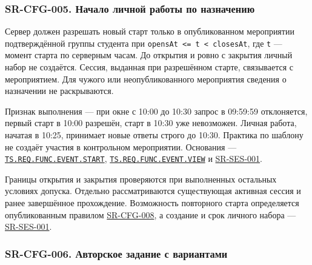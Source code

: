 \documentclass[12pt,a4paper]{article}
\begin{document}
\subsubsection{SR-CFG-005. Начало личной работы по назначению}\label{sr-cfg-005-ux43dux430ux447ux430ux43bux43e-ux43bux438ux447ux43dux43eux439-ux440ux430ux431ux43eux442ux44b-ux43fux43e-ux43dux430ux437ux43dux430ux447ux435ux43dux438ux44e}

\hypertarget{sr-cfg-005-начало-личной-работы-по-назначению}{}

\hypertarget{sr-cfg-005}{}

Сервер должен разрешать новый старт только в опубликованном мероприятии подтверждённой группы студента при \texttt{opensAt\ \textless{}=\ t\ \textless{}\ closesAt}, где \texttt{t} --- момент старта по серверным часам. До открытия и ровно с закрытия личный набор не создаётся. Сессия, выданная при разрешённом старте, связывается с мероприятием. Для чужого или неопубликованного мероприятия сведения о назначении не раскрываются.

Признак выполнения --- при окне с 10:00 до 10:30 запрос в 09:59:59 отклоняется, первый старт в 10:00 разрешён, старт в 10:30 уже невозможен. Личная работа, начатая в 10:25, принимает новые ответы строго до 10:30. Практика по шаблону не создаёт участия в контрольном мероприятии. Основания --- {\href{../02\_Техническое\_задание/DOC-02\_Техническое\_задание.pdf\#ts-req-func-event-start}{\texttt{TS.\allowbreak{}REQ.\allowbreak{}FUNC.\allowbreak{}EVENT.\allowbreak{}START}}}, {\href{../02\_Техническое\_задание/DOC-02\_Техническое\_задание.pdf\#ts-req-func-event-view}{\texttt{TS.\allowbreak{}REQ.\allowbreak{}FUNC.\allowbreak{}EVENT.\allowbreak{}VIEW}}} и {\hyperlink{sr-ses-001}{SR-SES-001}}.

Границы открытия и закрытия проверяются при выполненных остальных условиях допуска. Отдельно рассматриваются существующая активная сессия и ранее завершённое прохождение. Возможность повторного старта определяется опубликованным правилом {\hyperlink{sr-cfg-008}{SR-CFG-008}}, а создание и срок личного набора --- {\hyperlink{sr-ses-001}{SR-SES-001}}.

\subsubsection{SR-CFG-006. Авторское задание с вариантами}\label{sr-cfg-006-ux430ux432ux442ux43eux440ux441ux43aux43eux435-ux437ux430ux434ux430ux43dux438ux435-ux441-ux432ux430ux440ux438ux430ux43dux442ux430ux43cux438}
\end{document}

